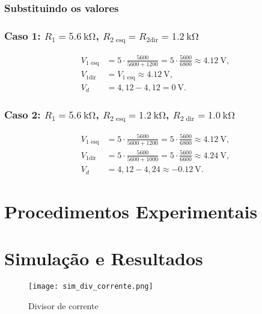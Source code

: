 \documentclass[a4paper, 12pt]{article}
\begin{document}
\subsubsection{Substituindo os valores}
\subsubsection*{Caso 1: $R_1 = \SI{5.6}{\kilo\ohm}$, $R_{2\text{ esq}} = R_{2\text{dir}} = \SI{1.2}{\kilo\ohm}$}
\begin{align*}
V_{1\text{ esq}} &= 5 \cdot \frac{5600}{5600+1200} 
= 5 \cdot \frac{5600}{6800} 
\approx \SI{4,12}{\volt}, \\[6pt]
V_{1\text{dir}} &= V_{1\text{ esq}} \approx \SI{4,12}{\volt}, \\[6pt]
V_d &= 4,12 - 4,12 = \SI{0}{\volt}.
\end{align*}

\subsubsection*{Caso 2: $R_1 = \SI{5.6}{\kilo\ohm}$, $R_{2\text{ esq}} = \SI{1.2}{\kilo\ohm}$, $R_{2\text{ dir}} = \SI{1.0}{\kilo\ohm}$}
\begin{align*}
V_{1\text{ esq}} &= 5 \cdot \frac{5600}{5600+1200} 
= 5 \cdot \frac{5600}{6800} 
\approx \SI{4,12}{\volt}, \\[6pt]
V_{1\text{dir}} &= 5 \cdot \frac{5600}{5600+1000} 
= 5 \cdot \frac{5600}{6600} 
\approx \SI{4,24}{\volt}, \\[6pt]
V_d &= 4,12 - 4,24 \approx \SI{-0,12}{\volt}.
\end{align*}

\section{Procedimentos Experimentais}

\section{Simulação e Resultados}

\begin{figure}[H]
\centering
\texttt{[image: sim\_div\_corrente.png]}
\caption{Divisor de corrente}
\label{fig:sim_div_corrente}
\end{figure}
\end{document}
